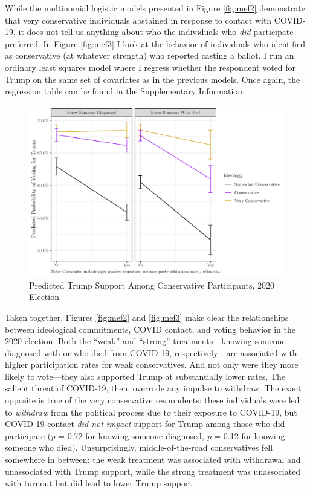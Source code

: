 \documentclass[
  12pt,
]{article}
\begin{document}
While the multinomial logistic models presented in Figure \ref{fig:mef2} demonstrate that very conservative individuals abstained in response to contact with COVID-19, it does not tell us anything about who the individuals who \emph{did} participate preferred. In Figure \ref{fig:mef3} I look at the behavior of individuals who identified as conservative (at whatever strength) who reported casting a ballot. I run an ordinary least squares model where I regress whether the respondent voted for Trump on the same set of covariates as in the previous models. Once again, the regression table can be found in the Supplementary Information.

\begin{figure}[H]

{\centering \includegraphics{theory_paper_files/figure-latex/mef3-c-1} 

}

\caption{\label{fig:mef3}Predicted Trump Support Among Conservative Participants, 2020 Election}\label{fig:mef3-c}
\end{figure}

Taken together, Figures \ref{fig:mef2} and \ref{fig:mef3} make clear the relationships between ideological commitments, COVID contact, and voting behavior in the 2020 election. Both the ``weak'' and ``strong'' treatments---knowing someone diagnosed with or who died from COVID-19, respectively---are associated with higher participation rates for weak conservatives. And not only were they more likely to vote---they also supported Trump at substantially lower rates. The salient threat of COVID-19, then, overrode any impulse to withdraw. The exact opposite is true of the very conservative respondents: these individuals were led to \emph{withdraw} from the political process due to their exposure to COVID-19, but COVID-19 contact \emph{did not impact} support for Trump among those who did participate (\emph{p} = 0.72 for knowing someone diagnosed, \emph{p} = 0.12 for knowing someone who died). Unsurprisingly, middle-of-the-road conservatives fell somewhere in between: the weak treatment was associated with withdrawal and unassociated with Trump support, while the strong treatment was unassociated with turnout but did lead to lower Trump support.
\end{document}
